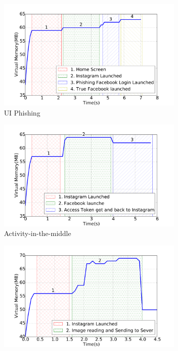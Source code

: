 \documentclass[letterpaper,12pt]{article}
\begin{document}
\begin{figure}[h]
        \centering
        \begin{subfigure}[t]{0.5\textwidth}
                \centering
               \includegraphics[width=\linewidth]{attack1memory.pdf}
                \caption{UI Phishing}
        \end{subfigure}%
        \begin{subfigure}[t]{0.5\textwidth}
                \centering
          \includegraphics[width=\linewidth]{attack2memory.pdf}
                \caption{Activity-in-the-middle}
        \end{subfigure}
        \begin{subfigure}[t]{0.5\textwidth}
                \centering
          \includegraphics[width=\linewidth]{attack4memory.pdf}

\end{subfigure}
\end{figure}
\end{document}
